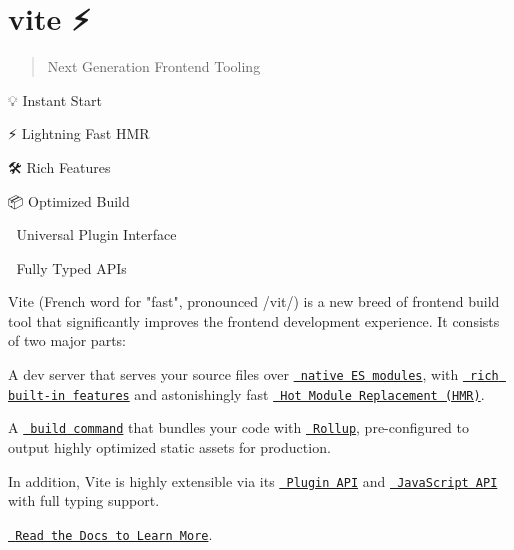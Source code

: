 \chapter{vite ⚡}
\hypertarget{md__2home_2solype_2delivery_2current__days_2trello_2front_2node__modules_2vite_2README}{}\label{md__2home_2solype_2delivery_2current__days_2trello_2front_2node__modules_2vite_2README}
\label{md__2home_2solype_2delivery_2current__days_2trello_2front_2node__modules_2vite_2README_autotoc_md13486}%
%
 \begin{quote}
Next Generation Frontend Tooling \end{quote}

\begin{DoxyItemize}
\item 💡 Instant  Start
\item ⚡️ Lightning Fast HMR
\item 🛠️ Rich Features
\item 📦 Optimized Build
\item 🔩 Universal Plugin Interface
\item 🔑 Fully Typed APIs
\end{DoxyItemize}

Vite (French word for "{}fast"{}, pronounced {\ttfamily /vit/}) is a new breed of frontend build tool that significantly improves the frontend development experience. It consists of two major parts\+:


\begin{DoxyItemize}
\item A dev server that serves your source files over \href{https://developer.mozilla.org/en-US/docs/Web/JavaScript/Guide/Modules}{\texttt{ native ES modules}}, with \href{https://vitejs.dev/guide/features.html}{\texttt{ rich built-\/in features}} and astonishingly fast \href{https://vitejs.dev/guide/features.html\#hot-module-replacement}{\texttt{ Hot Module Replacement (HMR)}}.
\item A \href{https://vitejs.dev/guide/build.html}{\texttt{ build command}} that bundles your code with \href{https://rollupjs.org}{\texttt{ Rollup}}, pre-\/configured to output highly optimized static assets for production.
\end{DoxyItemize}

In addition, Vite is highly extensible via its \href{https://vitejs.dev/guide/api-plugin.html}{\texttt{ Plugin API}} and \href{https://vitejs.dev/guide/api-javascript.html}{\texttt{ Java\+Script API}} with full typing support.

\href{https://vitejs.dev}{\texttt{ Read the Docs to Learn More}}. 